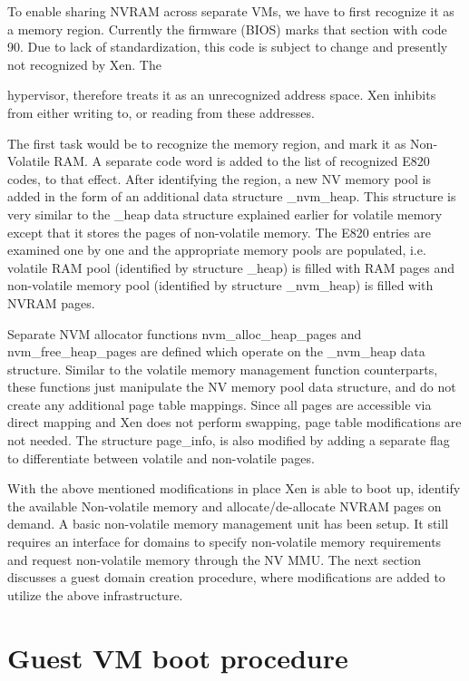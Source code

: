  To enable sharing NVRAM across separate VMs, we have to first recognize it as a memory region. Currently the firmware (BIOS) marks that section with code 90. Due to lack of standardization, this code is subject to change and presently not recognized by Xen. The

hypervisor, therefore treats it as an unrecognized address space. Xen inhibits from either writing to, or reading from these addresses.

The first task would be to recognize the memory region, and mark it as Non-Volatile RAM. A separate code word is added to the list of recognized E820 codes, to that effect. After identifying the region, a new NV memory pool is added in the form of an additional data structure \_nvm\_heap. This structure is very similar to the \_heap data structure explained earlier for volatile memory except that it stores the pages of non-volatile memory. The E820 entries are examined one by one and the appropriate memory pools are populated, i.e. volatile RAM pool (identified by structure \_heap) is filled with RAM pages and non-volatile memory pool (identified by structure \_nvm\_heap) is filled with NVRAM pages.

Separate NVM allocator functions nvm\_alloc\_heap\_pages and nvm\_free\_heap\_pages are defined which operate on the \_nvm\_heap data structure. Similar to the volatile memory management function counterparts, these functions just manipulate the NV memory pool data structure, and do not create any additional page table mappings. Since all pages are accessible via direct mapping and Xen does not perform swapping, page table modifications are not needed. The structure page\_info, is also modified by adding a separate flag to differentiate between volatile and non-volatile pages.

With the above mentioned modifications in place Xen is able to boot up, identify the available Non-volatile memory and allocate/de-allocate NVRAM pages on demand. A basic non-volatile memory management unit has been setup. It still requires an interface for domains to specify non-volatile memory requirements and request non-volatile memory through the NV MMU. The next section discusses a guest domain creation procedure, where modifications are added to utilize the above infrastructure. 

\section{Guest VM boot procedure}

